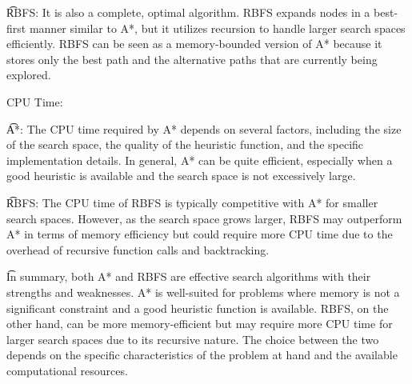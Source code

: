 \documentclass{article}
\begin{document}
\t RBFS: It is also a complete, optimal algorithm. RBFS expands nodes in a best-first manner similar to A*, but it utilizes recursion to handle larger search spaces efficiently. RBFS can be seen as a memory-bounded version of A* because it stores only the best path and the alternative paths that are currently being explored.

{CPU Time:}

\t A*: The CPU time required by A* depends on several factors, including the size of the search space, the quality of the heuristic function, and the specific implementation details. In general, A* can be quite efficient, especially when a good heuristic is available and the search space is not excessively large.

\t RBFS: The CPU time of RBFS is typically competitive with A* for smaller search spaces. However, as the search space grows larger, RBFS may outperform A* in terms of memory efficiency but could require more CPU time due to the overhead of recursive function calls and backtracking.

\t In summary, both A* and RBFS are effective search algorithms with their strengths and weaknesses. A* is well-suited for problems where memory is not a significant constraint and a good heuristic function is available. RBFS, on the other hand, can be more memory-efficient but may require more CPU time for larger search spaces due to its recursive nature. The choice between the two depends on the specific characteristics of the problem at hand and the available computational resources.
\end{document}
